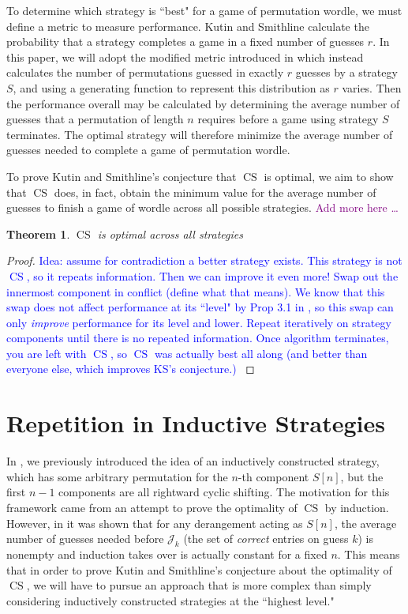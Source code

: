 \documentclass[article]{amsart}
\theoremstyle{plain}
\newtheorem{theorem}{Theorem}
\DeclareMathOperator{\CS}{CS}
\begin{document}
To determine which strategy is ``best" for a game of permutation wordle, we must define a metric to measure performance. Kutin and Smithline calculate the probability that a strategy completes a game in a fixed number of guesses $r$. In this paper, we will adopt the modified metric introduced in \cite{hiveley2025} which instead calculates the number of permutations guessed in exactly $r$ guesses by a strategy $S$, and using a generating function to represent this distribution as $r$ varies. Then the performance overall may be calculated by determining the average number of guesses that a permutation of length $n$ requires before a game using strategy $S$ terminates. The optimal strategy will therefore minimize the average number of guesses needed to complete a game of permutation wordle.

To prove Kutin and Smithline's conjecture that $\CS$ is optimal, we aim to show that $\CS$ does, in fact, obtain the minimum value for the average number of guesses to finish a game of wordle across all possible strategies. \textcolor{purple}{Add more here \dots }


\begin{theorem} \label{thm:csopt}
    $\CS$ is optimal across all strategies
\end{theorem}

\begin{proof}

\textcolor{blue}{
Idea: assume for contradiction a better strategy exists. This strategy is not $\CS$, so it repeats information. Then we can improve it even more! Swap out the innermost component in conflict (define what that means). We know that this swap does not affect performance at its ``level" by Prop 3.1 in \cite{hiveley2025}, so this swap can only \textit{improve} performance for its level and lower. Repeat iteratively on strategy components until there is no repeated information. Once algorithm terminates, you are left with $\CS$, so $\CS$ was actually best all along (and better than everyone else, which improves KS's conjecture.)
}
    
\end{proof}
\fi


\section{Repetition in Inductive Strategies} \label{sec:rep}

In \cite{hiveley2025}, we previously introduced the idea of an inductively constructed strategy, which has some arbitrary permutation for the $n$-th component $S[n]$, but the first $n-1$ components are all rightward cyclic shifting. The motivation for this framework came from an attempt to prove the optimality of $\CS$ by induction. However, in \cite{hiveley2025} it was shown that for any derangement acting as $S[n]$, the average number of guesses needed before $\mathcal{J}_k$ (the set of \textit{correct} entries on guess $k$) is nonempty and induction takes over is actually constant for a fixed $n$. This means that in order to prove Kutin and Smithline's conjecture about the optimality of $\CS$, we will have to pursue an approach that is more complex than simply considering inductively constructed strategies at the ``highest level." 
\end{document}
